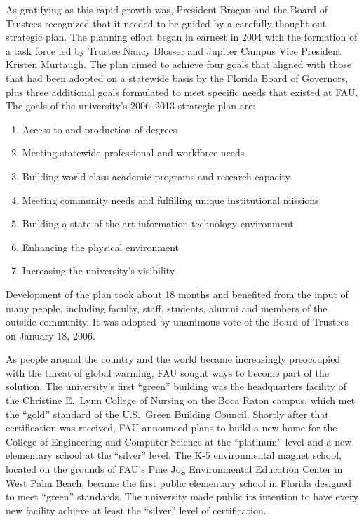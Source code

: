 \documentclass[phd, 12pt, print]{fauthesis}
\begin{document}
As gratifying as this rapid growth was, President Brogan and the Board of Trustees recognized that it needed to be guided by a carefully thought-out strategic plan. The planning effort began in earnest in 2004 with the formation of a task force led by Trustee Nancy Blosser and Jupiter Campus Vice President Kristen Murtaugh.  The plan aimed to achieve four goals that aligned with those that had been adopted on a statewide basis by the Florida Board of Governors, plus three additional goals formulated to meet specific needs that existed at FAU.  The goals of the university's 2006--2013 strategic plan are:
%
\begin{enumerate}
\item Access to and production of degrees
\item Meeting statewide professional and workforce needs
\item Building world-class academic programs and research capacity
\item Meeting community needs and fulfilling unique institutional missions
\item Building a state-of-the-art information technology environment
\item Enhancing the physical environment
\item Increasing the university's visibility
\end{enumerate}
%
Development of the plan took about 18 months and benefited from the input of many people, including faculty, staff, students, alumni and members of the outside community.  It was adopted by unanimous vote of the Board of Trustees on January 18, 2006.

As people around the country and the world became increasingly preoccupied with the threat of global warming, FAU sought ways to become part of the solution. The university's first ``green'' building was the headquarters facility of the Christine E.\ Lynn College of Nursing on the Boca Raton campus, which met the ``gold'' standard of the U.S.\ Green Building Council.  Shortly after that certification was received, FAU announced plans to build a new home for the College of Engineering and Computer Science at the ``platinum'' level and a new elementary school at the ``silver'' level.  The K-5 environmental magnet school, located on the grounds of FAU's Pine Jog Environmental Education Center in West Palm Beach, became the first public elementary school in Florida designed to meet ``green'' standards.  The university made public its intention to have every new facility achieve at least the ``silver'' level of certification.
\end{document}
